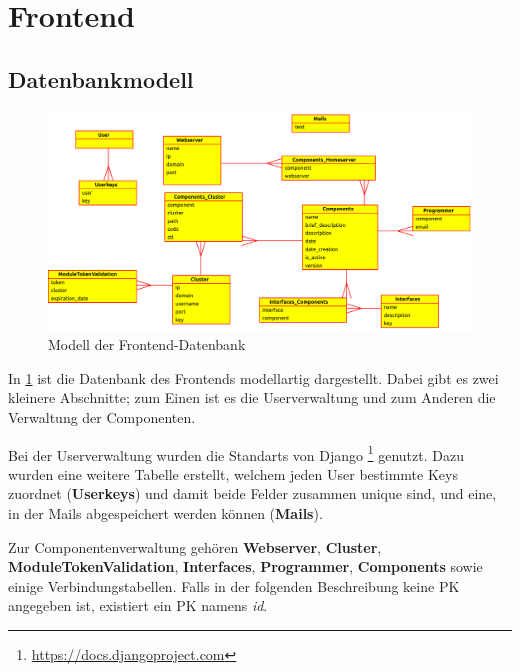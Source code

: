 \section{Frontend}

\subsection{Datenbankmodell}

\begin{figure}[H]
  \begin{center}
	\includegraphics[width=\linewidth]{bilder/ctl-db.pdf}
	\caption{Modell der Frontend-Datenbank}
	\label{fb_db}
  \end{center}
\end{figure}

In \ref{fb_db} ist die Datenbank des Frontends modellartig dargestellt. Dabei
gibt es zwei kleinere Abschnitte; zum Einen ist es die Userverwaltung und zum
Anderen die Verwaltung der Componenten. 

Bei der Userverwaltung wurden die Standarts von Django
\footnote{\url{https://docs.djangoproject.com}} genutzt. Dazu wurden eine
weitere Tabelle erstellt, welchem jeden User bestimmte Keys zuordnet
(\textbf{Userkeys}) und damit beide Felder zusammen unique sind, und eine, in 
der Mails abgespeichert werden können (\textbf{Mails}).

Zur Componentenverwaltung gehören \textbf{Webserver}, \textbf{Cluster},
\textbf{ModuleTokenValidation}, \textbf{Interfaces}, \textbf{Programmer}, 
\textbf{Components} sowie einige Verbindungstabellen.
Falls in der folgenden Beschreibung keine PK angegeben ist, existiert ein PK
namens \textit{id}. 

